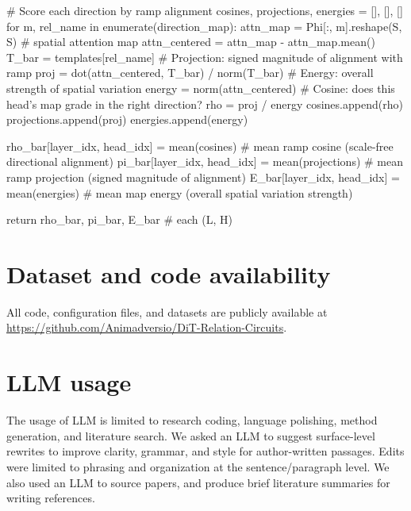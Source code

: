\begin{RoundedListing}[basicstyle=\fontsize{8}{9}\selectfont\ttfamily\color{atomForeground}]
            # Score each direction by ramp alignment
            cosines, projections, energies = [], [], []
            for m, rel_name in enumerate(direction_map):
                attn_map = Phi[:, m].reshape(S, S)      # spatial attention map
                attn_centered = attn_map - attn_map.mean()
                T_bar = templates[rel_name]
                # Projection: signed magnitude of alignment with ramp
                proj = dot(attn_centered, T_bar) / norm(T_bar)
                # Energy: overall strength of spatial variation
                energy = norm(attn_centered)
                # Cosine: does this head's map grade in the right direction?
                rho = proj / energy
                cosines.append(rho)
                projections.append(proj)
                energies.append(energy)

            rho_bar[layer_idx, head_idx] = mean(cosines) # mean ramp cosine  (scale-free directional alignment)
            pi_bar[layer_idx, head_idx]  = mean(projections) # mean ramp projection (signed magnitude of alignment)
            E_bar[layer_idx, head_idx]   = mean(energies) # mean map energy   (overall spatial variation strength)

    return rho_bar, pi_bar, E_bar  # each (L, H)
\end{RoundedListing}

\clearpage

\section{Dataset and code availability}
\label{sec:apbcode}
All code, configuration files, and datasets are publicly available at \url{https://github.com/Animadversio/DiT-Relation-Circuits}.


\section{LLM usage}
 
The usage of LLM is limited to research coding, language polishing, method generation, and literature search. We asked an LLM to suggest surface-level rewrites to improve clarity, grammar, and style for author-written passages. Edits were limited to phrasing and organization at the sentence/paragraph level. We also used an LLM to source papers, and produce brief literature summaries for writing references.
